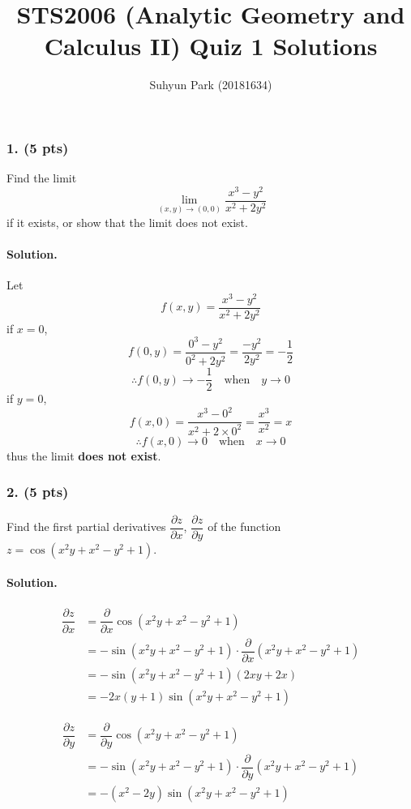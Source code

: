 
	


\title{STS2006 (Analytic Geometry and Calculus II) \newline Quiz 1 Solutions}
\author{Suhyun Park (20181634)}
\maketitle

\subsubsection{1. (5 pts)} Find the limit \[\lim_{\left(x, y\right)\rightarrow\left(0, 0\right)} \dfrac{x^3-y^2}{x^2+2y^2} \] if it exists, or show that the limit does not exist.

\paragraph{Solution.} Let \[f\left(x, y\right) = \dfrac{x^3-y^2}{x^2+2y^2}\]
if $x = 0$, \[f\left(0, y\right) = \dfrac{0^3-y^2}{0^2+2y^2} = \dfrac{-y^2}{2y^2} = -\dfrac{1}{2}\]
\[\therefore f\left(0, y\right)\rightarrow-\dfrac{1}{2}\quad\textrm{when}\quad y\rightarrow0 \]
if $y = 0$, \[f\left(x, 0\right) = \dfrac{x^3-0^2}{x^2+2 \times 0^2} = \dfrac{x^3}{x^2} = x\]
\[\therefore f\left(x, 0\right)\rightarrow0\quad\textrm{when}\quad x\rightarrow0 \]
thus the limit \textbf{does not exist}.

\subsubsection{2. (5 pts)} Find the first partial derivatives $\dfrac{\partial z}{\partial x}$, $\dfrac{\partial z}{\partial y}$ of the function $z = \cos\left(x^2y+x^2-y^2+1\right)$.
\par

\paragraph{Solution.}
\begin{align*}
	\dfrac{\partial z}{\partial x} &= \dfrac{\partial}{\partial x} \cos\left(x^2y+x^2-y^2+1\right)\\
	&= -\sin\left(x^2y+x^2-y^2+1\right)\cdot\dfrac{\partial}{\partial x}\left(x^2y+x^2-y^2+1\right)\\
	&= -\sin\left(x^2y+x^2-y^2+1\right)\left(2xy+2x\right)\\
	&= -2x\left(y+1\right)\sin\left(x^2y+x^2-y^2+1\right)
\end{align*}

\begin{align*}
	\dfrac{\partial z}{\partial y} &= \dfrac{\partial}{\partial y} \cos\left(x^2y+x^2-y^2+1\right)\\
	&= -\sin\left(x^2y+x^2-y^2+1\right)\cdot\dfrac{\partial}{\partial y}\left(x^2y+x^2-y^2+1\right)\\
	&= -\left(x^2-2y\right)\sin\left(x^2y+x^2-y^2+1\right)
\end{align*}


